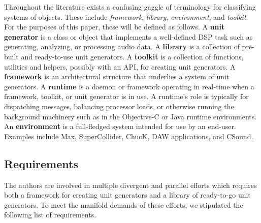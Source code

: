 \documentclass[twoside,10pt]{article}
\begin{document}
Throughout the literature exists a confusing gaggle of terminology for classifying systems of objects.  These include \emph{framework}, \emph{library}, \emph{environment}, and \emph{toolkit}.  For the purposes of this paper, these will be defined as follows.  
A \textbf{unit generator} is a class or object that implements a well-defined DSP task such as generating, analyzing, or processing audio data.
A \textbf{library} is a collection of pre-built and ready-to-use unit generators.
A \textbf{toolkit} is a collection of functions, utilities and helpers, possibly with an API, for creating unit generators.
A \textbf{framework} is an architectural structure that underlies a system of unit generators.
A \textbf{runtime} is a daemon or framework operating in real-time when a framework, toolkit, or unit generator is in use. A runtime's role is typically for dispatching messages, balancing processor loads, or otherwise running the background machinery such as in the Objective-C or Java runtime environments.
An \textbf{environment} is a full-fledged system intended for use by an end-user.  Examples include Max, SuperCollider, ChucK, DAW applications, and CSound.


\subsection{Requirements} \label{sec:Requirements}%
The authors are involved in multiple divergent and parallel efforts which requires both a framework for creating unit generators and a library of ready-to-go unit generators.  %
To meet the manifold demands of these efforts, we stipulated the following list of requirements.%
\end{document}
